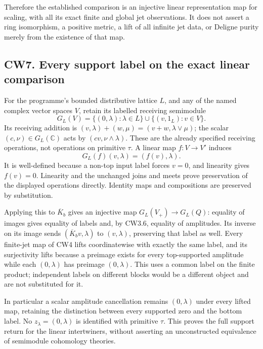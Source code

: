 Therefore the established comparison is an injective linear
representation map for scaling, with all its exact finite and global jet
observations. It does not assert a ring isomorphism, a positive metric,
a lift of all infinite jet data, or Deligne purity merely from the
existence of that map.

\subsection{CW7. Every support label on the exact linear
comparison}\label{cw7.-every-support-label-on-the-exact-linear-comparison}

For the programme's bounded distributive lattice \(L\), and any of the
named complex vector spaces \(V\), retain its labelled receiving
semimodule \[
G_L(V)=\{(0,\lambda):\lambda\in L\}\cup\{(v,1_L):v\in V\}.
\] Its receiving addition is
\((v,\lambda)+(w,\mu)=(v+w,\lambda\vee\mu)\); the scalar
\((c,\nu)\in G_L(\mathbb C)\) acts by \((cv,\nu\wedge\lambda)\). These
are the already specified receiving operations, not operations on
primitive \(\tau\). A linear map \(f:V\to V'\) induces \[
G_L(f)(v,\lambda)=(f(v),\lambda).
\tag{CW7.1}
\] It is well-defined because a non-top input label forces \(v=0\), and
linearity gives \(f(v)=0\). Linearity and the unchanged joins and meets
prove preservation of the displayed operations directly. Identity maps
and compositions are preserved by substitution.

Applying this to \(\overline K_b\) gives an injective map
\(G_L(V_+)\to G_L(Q)\): equality of images gives equality of labels and,
by CW3.6, equality of amplitudes. Its inverse on its image sends
\((\overline K_bv,\lambda)\) to \((v,\lambda)\), preserving that label
as well. Every finite-jet map of CW4 lifts coordinatewise with exactly
the same label, and its surjectivity lifts because a preimage exists for
every top-supported amplitude while each \((0,\lambda)\) has preimage
\((0,\lambda)\). This uses a common label on the finite product;
independent labels on different blocks would be a different object and
are not substituted for it.

In particular a scalar amplitude cancellation remains \((0,\lambda)\)
under every lifted map, retaining the distinction between every
supported zero and the bottom label. No \(z_\lambda=(0,\lambda)\) is
identified with primitive \(\tau\). This proves the full support return
for the linear intertwiners, without asserting an unconstructed
equivalence of semimodule cohomology theories.

